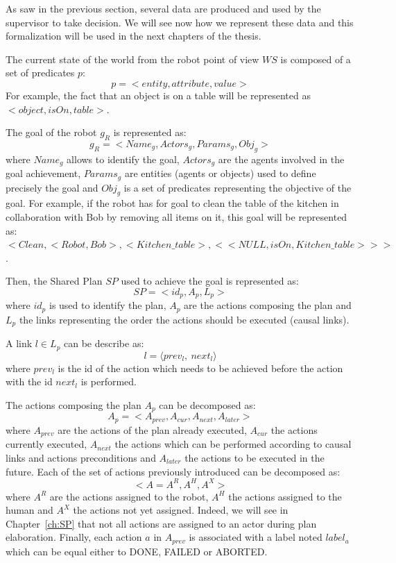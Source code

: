 \documentclass[english,a4paper,11pt,twoside]{StyleThese}
\begin{document}
\label{sec:data}

As saw in the previous section, several data are produced and used by the supervisor to take decision. We will see now how we represent these data and this formalization will be used in the next chapters of the thesis.

The current state of the world from the robot point of view $WS$ is composed of a set of predicates $p$:
$$p = <entity, attribute, value>$$
For example, the fact that an object is on a table will be represented as $<object, isOn, table>$.

The goal of the robot $g_R$ is represented as:
$$g_R = <Name_g, Actors_g, Params_g, Obj_g>$$
where $Name_g$ allows to identify the goal, $Actors_g$ are the agents involved in the goal achievement, $Params_g$ are entities  (agents or objects) used to define precisely the goal and $Obj_g$ is a set of predicates representing the objective of the goal.
For example, if the robot has for goal to clean the table of the kitchen in collaboration with Bob by removing all items on it, this goal will be represented as:
$<Clean, <Robot, Bob>, <Kitchen\_table>, <<NULL, isOn, Kitchen\_table>>>$.

Then, the Shared Plan $SP$ used to achieve the goal is represented as:
$$SP = <id_p, A_p, L_p>$$
where $id_p$ is used to identify the plan, $A_p$ are the actions composing the plan and $L_p$ the links representing the order the actions should be executed (causal links).

A link $l \in L_p$ can be describe as:
 $$l = \langle prev_l, \ next_l \rangle$$
where $prev_l$ is the id of the action which needs to be achieved before the action with the id $next_l$ is performed. 

The actions composing the plan $A_p$ can be decomposed as:
$$A_p = <A_{prev}, A_{cur}, A_{next}, A_{later}>$$
where $A_{prev}$ are the actions of the plan already executed, $A_{cur}$ the actions currently executed, $A_{next}$ the actions which can be performed according to causal links and actions preconditions and $A_{later}$ the actions to be executed in the future.
Each of the set of actions previously introduced can be decomposed as:
$$<A = A^R, A^H, A^X>$$
where $A^R$ are the actions assigned to the robot, $A^H$ the actions assigned to the human and $A^X$ the actions not yet assigned. Indeed, we will see in Chapter~\ref{ch:SP} that not all actions are assigned to an actor during plan elaboration.
Finally, each action $a$ in $A_{prev}$ is associated with a label noted $label_a$ which can be equal either to DONE, FAILED or ABORTED.
\end{document}
